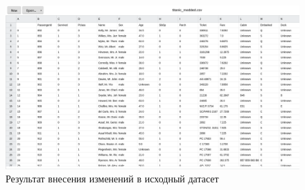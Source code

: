 \documentclass[a4paper]{article}
\begin{document}
{    \begin{figure}[h]
        \centering
        \graphicspath{{./}}
        \includegraphics[scale=0.383]{run_program_2_modded_dataset.png}
        \caption{Результат внесения изменений в исходный датасет}
    \end{figure}
}
\end{document}
